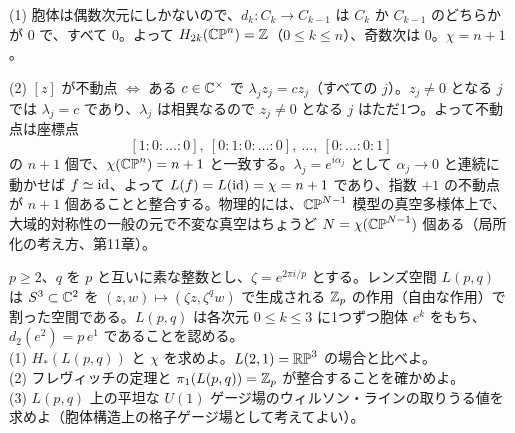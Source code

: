 \begin{solution}
(1) 胞体は偶数次元にしかないので、$d_k\colon C_k\to C_{k-1}$ は $C_k$ か $C_{k-1}$ のどちらかが $0$ で、すべて $0$。よって $H_{2k}(\mathbb{CP}^n)=\mathbb{Z}$（$0\le k\le n$）、奇数次は $0$。$\chi=n+1$。

(2) $[z]$ が不動点 $\iff$ ある $c\in\mathbb{C}^\times$ で $\lambda_jz_j=cz_j$（すべての $j$）。$z_j\ne0$ となる $j$ では $\lambda_j=c$ であり、$\lambda_j$ は相異なるので $z_j\ne0$ となる $j$ はただ1つ。よって不動点は座標点
\[
[1:0:\dots:0],\ [0:1:0:\dots:0],\ \dots,\ [0:\dots:0:1]
\]
の $n+1$ 個で、$\chi(\mathbb{CP}^n)=n+1$ と一致する。$\lambda_j=e^{i\alpha_j}$ として $\alpha_j\to0$ と連続に動かせば $f\simeq\mathrm{id}$、よって $L(f)=L(\mathrm{id})=\chi=n+1$ であり、指数 $+1$ の不動点が $n+1$ 個あることと整合する。物理的には、$\mathbb{CP}^{N-1}$ 模型の真空多様体上で、大域的対称性の一般の元で不変な真空はちょうど $N=\chi(\mathbb{CP}^{N-1})$ 個ある（局所化の考え方、第11章）。
\end{solution}

\begin{problem}[難易度 B]\label{ch04-prob-lens}
$p\ge2$、$q$ を $p$ と互いに素な整数とし、$\zeta=e^{2\pi i/p}$ とする。レンズ空間 $L(p,q)$ は $S^3\subset\mathbb{C}^2$ を $(z,w)\mapsto(\zeta z,\zeta^qw)$ で生成される $\mathbb{Z}_p$ の作用（自由な作用）で割った空間である。$L(p,q)$ は各次元 $0\le k\le3$ に1つずつ胞体 $e^k$ をもち、$d_2(e^2)=p\,e^1$ であることを認める。\\
(1) $H_*(L(p,q))$ と $\chi$ を求めよ。$L(2,1)=\mathbb{RP}^3$ の場合と比べよ。\\
(2) フレヴィッチの定理と $\pi_1(L(p,q))=\mathbb{Z}_p$ が整合することを確かめよ。\\
(3) $L(p,q)$ 上の平坦な $U(1)$ ゲージ場のウィルソン・ラインの取りうる値を求めよ（胞体構造上の格子ゲージ場として考えてよい）。
\end{problem}

